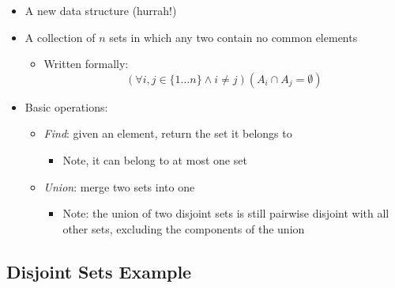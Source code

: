 \documentclass[
  10pt,
  english,
  letterpaper,
,tablecaptionabove
]{scrartcl}
\providecommand{\tightlist}{%
  \setlength{\itemsep}{0pt}\setlength{\parskip}{0pt}}
\begin{document}
\begin{itemize}
\tightlist
\item
  A new data structure (hurrah!)
\item
  A collection of \(n\) sets in which any two contain no common elements

  \begin{itemize}
  \tightlist
  \item
    Written formally: \[
    (\forall i, j \in \{1 \dots n\} \land i \neq j) (A_i \cap A_j = \emptyset)
    \]
  \end{itemize}
\item
  Basic operations:

  \begin{itemize}
  \tightlist
  \item
    \emph{Find}: given an element, return the set it belongs to

    \begin{itemize}
    \tightlist
    \item
      Note, it can belong to at most one set
    \end{itemize}
  \item
    \emph{Union}: merge two sets into one

    \begin{itemize}
    \tightlist
    \item
      Note: the union of two disjoint sets is still pairwise disjoint
      with all other sets, excluding the components of the union
    \end{itemize}
  \end{itemize}
\end{itemize}

\hypertarget{disjoint-sets-example}{%
\subsection{Disjoint Sets Example}\label{disjoint-sets-example}}
\end{document}
